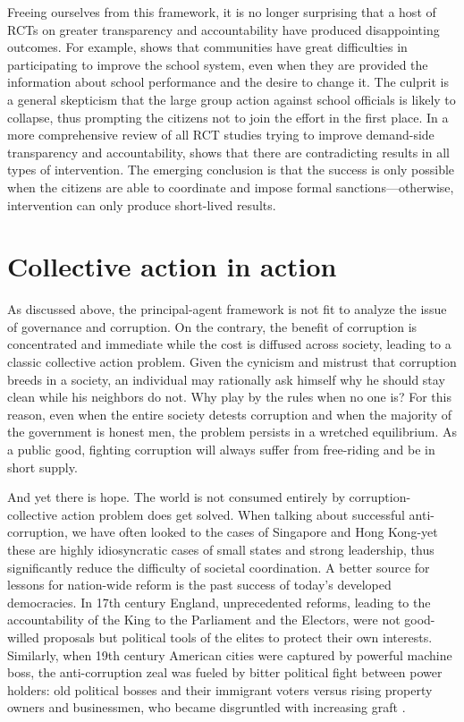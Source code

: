 \documentclass[12pt]{article}
\begin{document}
Freeing ourselves from this framework, it is no longer surprising that a host of RCTs on greater transparency and accountability have produced disappointing outcomes. For example, \citet{Banerjee2010} shows that communities have great difficulties in participating to improve the school system, even when they are provided the information about school performance and the desire to change it. The culprit is a general skepticism that the large group action against school officials is likely to collapse, thus prompting the citizens not to join the effort in the first place. In a more comprehensive review of all RCT studies trying to improve demand-side transparency and accountability, \citet{Joshi2010a} shows that there are contradicting results in all types of intervention. The emerging conclusion is that the success is only possible when the citizens are able to coordinate and impose formal sanctions---otherwise, intervention can only produce short-lived results.

\section{Collective action in action}
\label{sec:collectiveaction}

As discussed above, the principal-agent framework is not fit to analyze the issue of governance and corruption. On the contrary, the benefit of corruption is concentrated and immediate while the cost is diffused across society, leading to a classic collective action problem. Given the cynicism and mistrust that corruption breeds in a society, an individual may rationally ask himself why he should stay clean while his neighbors do not. Why play by the rules when no one is? For this reason, even when the entire society detests corruption and when the majority of the government is honest men, the problem persists in a wretched equilibrium. As a public good, fighting corruption will always suffer from free-riding and be in short supply.

And yet there is hope. The world is not consumed entirely by corruption-collective action problem does get solved. When talking about successful anti-corruption, we have often looked to the cases of Singapore and Hong Kong-yet these are highly idiosyncratic cases of small states and strong leadership, thus significantly reduce the difficulty of societal coordination. A better source for lessons for nation-wide reform is the past success of today's developed democracies. In 17th century England, unprecedented reforms, leading to the accountability of the King to the Parliament and the Electors, were not good-willed proposals but political tools of the elites to protect their own interests. Similarly, when 19th century American cities were captured by powerful machine boss, the anti-corruption zeal was fueled by bitter political fight between power holders: old political bosses and their immigrant voters versus rising property owners and businessmen, who became disgruntled with increasing graft \citep[204]{Rose-Ackerman1999}.
\end{document}
